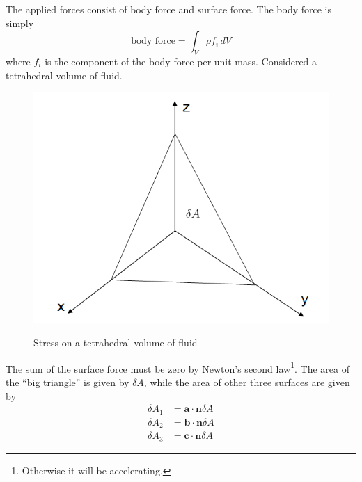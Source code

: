 The applied forces consist of body force and surface force.
\newslide
The body force is simply
\begin{equation}\label{mom:bodyf}
    \text{body force} = \int_V\rho f_i\,dV
\end{equation}
where $f_i$ is the component of the body force per unit mass.
\newslide
Considered a tetrahedral volume of fluid.
\begin{figure}[htpb]
  \centering
  \includegraphics[width=0.9\textheight]{stress.png}\\
  \caption{Stress on a tetrahedral volume of fluid}\label{stress}
\end{figure}
\newslide
The sum of the surface force must be zero by Newton's second
law\footnote{Otherwise it will be accelerating.}. The area of the
``big triangle'' is given by $\delta A$, while the area of other
three surfaces are given by
\begin{subequations}
\begin{align}
    \delta A_1&=\mathbf{a}\cdot \mathbf{n} \delta A\\
    \delta A_2&=\mathbf{b}\cdot \mathbf{n} \delta A\\
    \delta A_3&=\mathbf{c}\cdot \mathbf{n} \delta A
\end{align}
\end{subequations}

